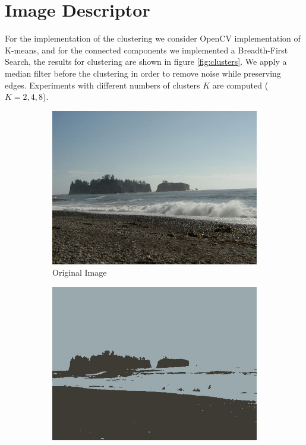 \section{Image Descriptor}

For the implementation of the clustering we consider OpenCV implementation of K-means, and for the connected components we implemented a Breadth-First Search, the results for clustering are shown in figure \ref{fig:clusters}. We apply a median filter before the clustering in order to remove noise while preserving edges. Experiments with different numbers of clusters $K$ are computed ($K = 2, 4, 8$).

\begin{figure}[!h]
	\centering
	\begin{subfigure}{0.5\textwidth}
	  \centering
	  \includegraphics[width=0.9\linewidth]{figs/beach_1.jpg}
	  \caption{Original Image}
	\end{subfigure}%
	\begin{subfigure}{0.5\textwidth}
	  \centering
	  \includegraphics[width=0.9\linewidth]{figs/beach_1_clustK2.jpg}

\end{subfigure}
\end{figure}
